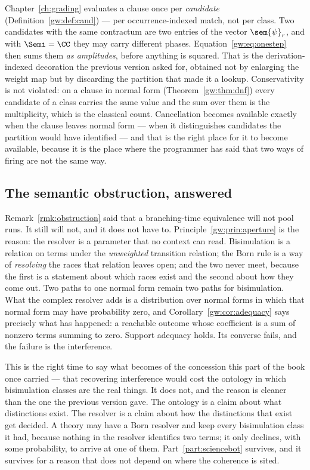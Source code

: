Chapter~\ref{ch:grading} evaluates a clause once per \emph{candidate}
(Definition~\ref{gw:def:cand}) --- per occurrence-indexed match, not per
class.  Two candidates with the same contractum are two entries of the vector
$\sem{\psi}_r$, and with $\Semi = \CC$ they may carry different phases.
Equation~\eqref{gw:eq:onestep} then sums them \emph{as amplitudes}, before
anything is squared.  That is the derivation-indexed decoration the previous
version asked for, obtained not by enlarging the weight map but by discarding
the partition that made it a lookup.  Conservativity is not violated: on a
clause in normal form (Theorem~\ref{gw:thm:dnf}) every candidate of a class
carries the same value and the sum over them is the multiplicity, which is
the classical count.  Cancellation becomes available exactly when the clause
leaves normal form --- when it distinguishes candidates the partition would
have identified --- and that is the right place for it to become available,
because it is the place where the programmer has said that two ways of
firing are not the same way.

\subsection{The semantic obstruction, answered}

Remark~\ref{rmk:obstruction} said that a branching-time equivalence will not
pool runs.  It still will not, and it does not have to.
Principle~\ref{gw:prin:aperture} is the reason: the resolver is a parameter
that no context can read.  Bisimulation is a relation on terms under the
\emph{unweighted} transition relation; the Born rule is a way of
\emph{resolving} the races that relation leaves open; and the two never meet,
because the first is a statement about which races exist and the second about
how they come out.  Two paths to one normal form remain two paths for
bisimulation.  What the complex resolver adds is a distribution over normal
forms in which that normal form may have probability zero, and
Corollary~\ref{gw:cor:adequacy} says precisely what has happened: a
reachable outcome whose coefficient is a sum of nonzero terms summing to
zero.  Support adequacy holds.  Its converse fails, and the failure is the
interference.

This is the right time to say what becomes of the concession this part of
the book once carried --- that recovering interference would cost the
ontology in which bisimulation classes are the real things.  It does not,
and the reason is cleaner than the one the previous version gave.  The
ontology is a claim about what distinctions exist.  The resolver is a claim
about how the distinctions that exist get decided.  A theory may have a Born
resolver and keep every bisimulation class it had, because nothing in the
resolver identifies two terms; it only declines, with some probability, to
arrive at one of them.  Part~\ref{part:sciencebot} survives, and it survives
for a reason that does not depend on where the coherence is sited.

